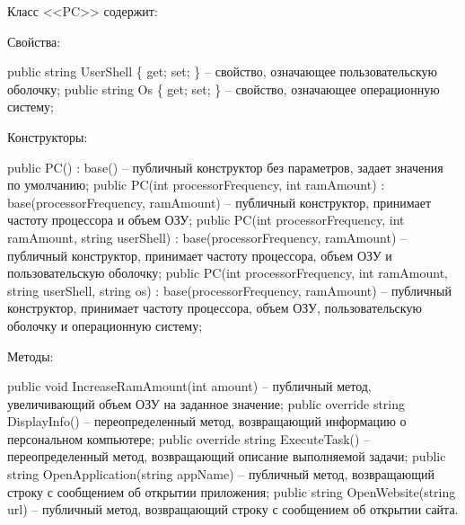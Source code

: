 \documentclass[oneside,14pt,a4paper]{extarticle}
\renewcommand{\item}{\itemindent1.25cm\itemold}
\begin{document}
  Класс <<PC>> содержит:
  \begin{itemize}
    \item[--] Свойства:
    \begin{itemize}
      \item[--] public string UserShell \{ get; set; \} -- свойство, означающее пользовательскую оболочку;
      \item[--] public string Os \{ get; set; \} -- свойство, означающее операционную систему;
    \end{itemize}
    \item[--] Конструкторы:
    \begin{itemize}
      \item[--] public PC() : base() -- публичный конструктор без параметров, задает значения по умолчанию;
      \item[--] public PC(int processorFrequency, int ramAmount) : \\
      base(processorFrequency, ramAmount) -- публичный конструктор, принимает частоту процессора и объем ОЗУ;
      \item[--] public PC(int processorFrequency, int ramAmount, string userShell) : base(processorFrequency, ramAmount) -- публичный конструктор, принимает частоту процессора, объем ОЗУ и пользовательскую оболочку;
      \item[--] public PC(int processorFrequency, int ramAmount, string userShell, string os) : base(processorFrequency, ramAmount) -- публичный конструктор, принимает частоту процессора, объем ОЗУ, пользовательскую оболочку и операционную систему;
    \end{itemize}
    \item[--] Методы:
    \begin{itemize}
      \item[--] public void IncreaseRamAmount(int amount) -- публичный метод, увеличивающий объем ОЗУ на заданное значение;
      \item[--] public override string DisplayInfo() -- переопределенный метод, возвращающий информацию о персональном компьютере;
      \item[--] public override string ExecuteTask() -- переопределенный метод, возвращающий описание выполняемой задачи;
      \item[--] public string OpenApplication(string appName) -- публичный метод, возвращающий строку с сообщением об открытии приложения;
      \item[--] public string OpenWebsite(string url) -- публичный метод, возвращающий строку с сообщением об открытии сайта.
    \end{itemize}
  \end{itemize}
\end{document}
